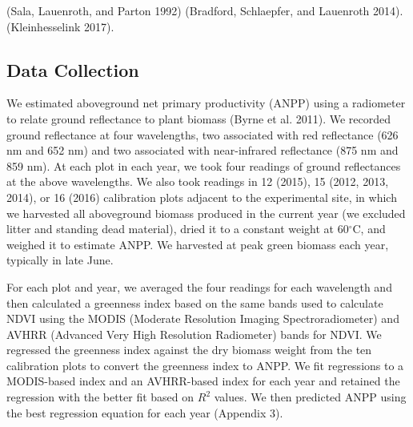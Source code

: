 \documentclass[fleqn,10pt,lineno]{wlpeerj} %
\begin{document}
(Sala, Lauenroth, and Parton 1992)
(Bradford, Schlaepfer, and Lauenroth 2014).
(Kleinhesselink 2017).

\hypertarget{data-collection}{%
\subsection{Data Collection}\label{data-collection}}

We estimated aboveground net primary productivity (ANPP) using a
radiometer to relate ground reflectance to plant biomass (Byrne et al.
2011). We recorded ground reflectance at four wavelengths, two
associated with red reflectance (626 nm and 652 nm) and two associated
with near-infrared reflectance (875 nm and 859 nm). At each plot in each
year, we took four readings of ground reflectances at the above
wavelengths. We also took readings in 12 (2015), 15 (2012, 2013, 2014),
or 16 (2016) calibration plots adjacent to the experimental site, in
which we harvested all aboveground biomass produced in the current year
(we excluded litter and standing dead material), dried it to a constant
weight at 60\(^{\circ}\)C, and weighed it to estimate ANPP. We harvested
at peak green biomass each year, typically in late June.

For each plot and year, we averaged the four readings for each
wavelength and then calculated a greenness index based on the same bands
used to calculate NDVI using the MODIS (Moderate Resolution Imaging
Spectroradiometer) and AVHRR (Advanced Very High Resolution Radiometer)
bands for NDVI. We regressed the greenness index against the dry biomass
weight from the ten calibration plots to convert the greenness index to
ANPP. We fit regressions to a MODIS-based index and an AVHRR-based index
for each year and retained the regression with the better fit based on
\(R^2\) values. We then predicted ANPP using the best regression
equation for each year (Appendix 3).
\end{document}
